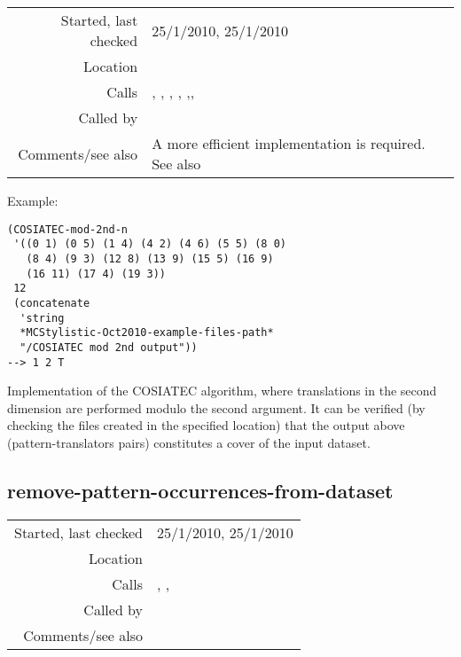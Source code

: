 \vspace{0.3cm}
\begin{tabular}{r|p{8cm}}
Started, last checked & 25/1/2010, 25/1/2010 \\
Location & \nameref{sec:further-structural-induction-algorithms} \\
Calls & \nameref{fun:argmax-of-threeCs}, \nameref{fun:read-from-file}, \nameref{fun:remove-pattern-occs-from-dataset-mod-2nd-n}, \nameref{fun:SIA-reflected-for-COSIATEC-mod-2nd-n}, \nameref{fun:SIATEC-mod-2nd-n},\newline \nameref{fun:threeCs-pattern-trans-pairs-mod-2nd-n}, \nameref{fun:write-to-file} \\
Called by & \\
Comments/see also & A more efficient implementation is required. See also \nameref{fun:COSIATEC}
\end{tabular}

\vspace{0.5cm}
\noindent Example:
\begin{verbatim}
(COSIATEC-mod-2nd-n
 '((0 1) (0 5) (1 4) (4 2) (4 6) (5 5) (8 0)
   (8 4) (9 3) (12 8) (13 9) (15 5) (16 9)
   (16 11) (17 4) (19 3))
 12
 (concatenate
  'string
  *MCStylistic-Oct2010-example-files-path*
  "/COSIATEC mod 2nd output"))
--> 1 2 T
\end{verbatim}

\noindent Implementation of the COSIATEC algorithm,
where translations in the second dimension are
performed modulo the second argument. It can be
verified (by checking the files created in the
specified location) that the output above
(pattern-translators pairs) constitutes a cover of the
input dataset.


\subsection*{remove-pattern-occurrences-from-dataset}\label{fun:remove-pattern-occurrences-from-dataset}

\vspace{0.3cm}
\begin{tabular}{r|p{8cm}}
Started, last checked & 25/1/2010, 25/1/2010 \\
Location & \nameref{sec:further-structural-induction-algorithms} \\
Calls & \nameref{fun:set-difference-multidimensional-sorted-asc}, \nameref{fun:translations},\newline \nameref{fun:unions-multidimensional-sorted-asc} \\
Called by & \nameref{fun:COSIATEC} \\
Comments/see also & \nameref{fun:remove-pattern-occs-from-dataset-mod-2nd-n}
\end{tabular}

